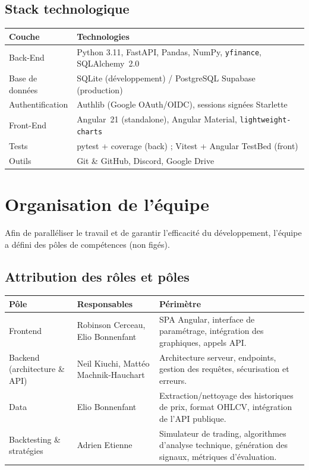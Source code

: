 \documentclass[11pt,a4paper]{article}
\newcommand{\code}[1]{\texttt{#1}}
\begin{document}
\subsection{Stack technologique}
\begin{center}
\begin{tabular}{@{}ll@{}}
\toprule
\textbf{Couche} & \textbf{Technologies} \\
\midrule
Back-End  & Python 3.11, FastAPI, Pandas, NumPy, \code{yfinance}, SQLAlchemy~2.0 \\
Base de données & SQLite (développement) / PostgreSQL Supabase (production) \\
Authentification & Authlib (Google OAuth/OIDC), sessions signées Starlette \\
Front-End & Angular~21 (standalone), Angular Material, \code{lightweight-charts} \\
Tests     & pytest + coverage (back) ; Vitest + Angular TestBed (front) \\
Outils    & Git \& GitHub, Discord, Google Drive \\
\bottomrule
\end{tabular}
\end{center}

\section{Organisation de l'équipe}
Afin de paralléliser le travail et de garantir l'efficacité du développement,
l'équipe a défini des pôles de compétences (non figés).

\subsection{Attribution des rôles et pôles}
\begin{center}
\begin{tabular}{@{}p{4.2cm}p{4.4cm}p{5.6cm}@{}}
\toprule
\textbf{Pôle} & \textbf{Responsables} & \textbf{Périmètre} \\
\midrule
Frontend & Robinson Cerceau, Elio Bonnenfant & SPA Angular, interface de
paramétrage, intégration des graphiques, appels API. \\
Backend (architecture \& API) & Neil Kiuchi, Mattéo Machnik-Hauchart &
Architecture serveur, endpoints, gestion des requêtes, sécurisation et erreurs. \\
Data & Elio Bonnenfant & Extraction/nettoyage des historiques de prix, format
OHLCV, intégration de l'API publique. \\
Backtesting \& stratégies & Adrien Etienne & Simulateur de trading, algorithmes
d'analyse technique, génération des signaux, métriques d'évaluation. \\
\bottomrule
\end{tabular}
\end{center}
\end{document}
